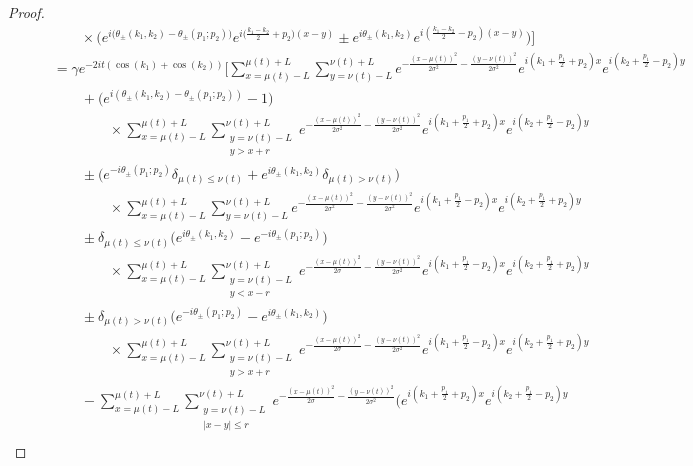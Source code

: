 \documentclass[../thesis-main/thesis-main]{subfiles}
\begin{document}
\begin{proof}
\begin{align}
  &\qquad\qquad \times\Big(e^{i\big(\theta_{\pm}(k_1,k_2) - \theta_\pm(p_1;p_2)\big)} e^{i \big(\frac{k_1 - k_2}{2} + p_2 \big) (x-y)} \pm  e^{i\theta_{\pm}(k_1,k_2) }e^{i (\frac{k_1-k_2}{2} - p_2 )(x-y)} \Big)\Bigg]\\
  &\qquad = \gamma e^{-2it (\cos(k_1) + \cos(k_2))} \Bigg[ \sum_{x=\mu(t)-L}^{\mu(t)+L} \sum_{y=\nu(t)-L}^{\nu(t)+L} e^{-\frac{(x-\mu(t))^2}{2\sigma^2} - \frac{(y-\nu(t))^2}{2\sigma^2}} e^{i (k_1 + \frac{p_1}{2} + p_2)x}e^{i(k_2 + \frac{p_1}{2} - p_2)y} \nonumber\\ 
  &\qquad\qquad + \Big(e^{i(\theta_{\pm}(k_1,k_2) - \theta_{\pm}(p_1;p_2))} - 1\Big)\nonumber\\
  &\qquad\qquad\qquad\times\sum_{x=\mu(t)-L}^{\mu(t)+L} \sum_{\substack{y=\nu(t)-L\\y>x+r}}^{\nu(t)+L} e^{-\frac{(x-\mu(t))^2}{2\sigma^2} - \frac{(y-\nu(t))^2}{2\sigma^2}} e^{i (k_1 + \frac{p_1}{2} + p_2)x}e^{i(k_2 + \frac{p_1}{2} - p_2)y}\nonumber\\
  &\qquad\qquad \pm \Big(e^{-i\theta_{\pm}(p_1;p_2)}\delta_{\mu(t)\leq\nu(t)} + e^{i  \theta_{\pm}(k_1,k_2)}\delta_{\mu(t) > \nu(t)}\Big)\nonumber\\
  &\qquad\qquad\qquad\times\sum_{x=\mu(t)-L}^{\mu(t)+L} \sum_{y=\nu(t)-L}^{\nu(t)+L} e^{-\frac{(x-\mu(t))^2}{2\sigma^2} - \frac{(y-\nu(t))^2}{2\sigma^2}} e^{i (k_1 + \frac{p_1}{2} - p_2)x}e^{i(k_2 + \frac{p_1}{2} + p_2)y}\nonumber\\
  &\qquad\qquad \pm \delta_{\mu(t)\leq \nu(t)} \big( e^{i\theta_{\pm}(k_1,k_2)} - e^{-i\theta_{\pm}(p_1;p_2)}\big)\nonumber\\
  &\qquad\qquad\qquad\times\sum_{x=\mu(t)-L}^{\mu(t)+L} \sum_{\substack{y=\nu(t)-L\\y< x-r}}^{\nu(t)+L} e^{-\frac{(x-\mu(t))^2}{2\sigma} - \frac{(y-\nu(t))^2}{2\sigma^2}} e^{i (k_1 + \frac{p_1}{2} - p_2)x}e^{i(k_2 + \frac{p_1}{2} + p_2)y}\nonumber\\
  &\qquad\qquad \pm \delta_{\mu(t)> \nu(t)} \big( e^{-i\theta_{\pm}(p_1;p_2)} - e^{i\theta_{\pm}(k_1,k_2)}\big)\nonumber\\
  &\qquad\qquad\qquad\times\sum_{x=\mu(t)-L}^{\mu(t)+L} \sum_{\substack{y=\nu(t)-L\\y> x+r}}^{\nu(t)+L} e^{-\frac{(x-\mu(t))^2}{2\sigma} - \frac{(y-\nu(t))^2}{2\sigma^2}} e^{i (k_1 + \frac{p_1}{2} - p_2)x}e^{i(k_2 + \frac{p_1}{2} + p_2)y}\nonumber\\
  &\qquad\qquad -\sum_{x=\mu(t)-L}^{\mu(t)+L} \sum_{\substack{y=\nu(t)-L\\|x-y|\leq r}}^{\nu(t)+L} e^{-\frac{(x-\mu(t))^2}{2\sigma} - \frac{(y-\nu(t))^2}{2\sigma^2}}\bigg( e^{i (k_1 + \frac{p_1}{2} + p_2)x}e^{i(k_2 + \frac{p_1}{2} - p_2)y} \nonumber\\

\end{align}
\end{proof}
\end{document}
